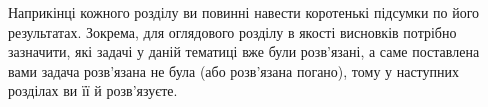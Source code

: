 \chapconclude

Наприкінці кожного розділу ви повинні навести коротенькі підсумки по його 
результатах. Зокрема, для оглядового розділу в якості висновків потрібно 
зазначити, які задачі у даній тематиці вже були розв'язані, а саме 
поставлена вами задача розв'язана не була (або розв'язана погано), тому у 
наступних розділах ви її й розв'язуєте.
